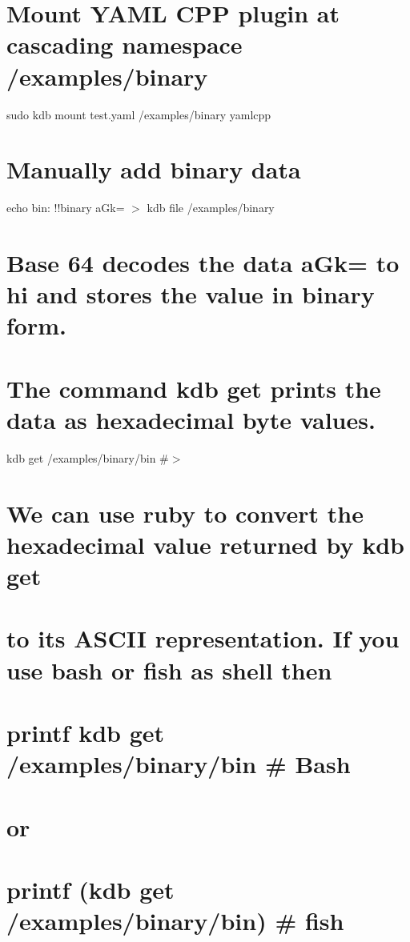  \section*{Mount Y\+A\+ML C\+PP plugin at cascading namespace {\ttfamily /examples/binary}}

sudo kdb mount test.\+yaml /examples/binary yamlcpp \section*{Manually add binary data}

echo \textquotesingle{}bin\+: !!binary a\+Gk=\textquotesingle{} $>$ {\ttfamily kdb file /examples/binary}

\section*{Base 64 decodes the data {\ttfamily a\+Gk=} to {\ttfamily hi} and stores the value in binary form.}

\section*{The command {\ttfamily kdb get} prints the data as hexadecimal byte values.}

kdb get /examples/binary/bin \#$>$ 

\section*{We can use {\ttfamily ruby} to convert the hexadecimal value returned by {\ttfamily kdb get}}

\section*{to its A\+S\+C\+II representation. If you use {\ttfamily bash} or {\ttfamily fish} as shell then}

\section*{printf {\ttfamily kdb get /examples/binary/bin} \# Bash}

\section*{or}

\section*{printf (kdb get /examples/binary/bin) \# fish}

